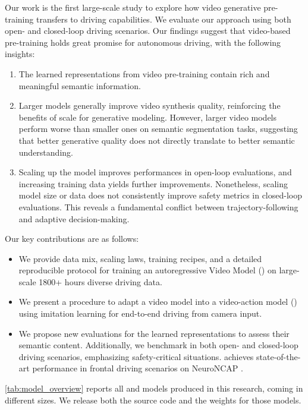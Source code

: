 Our work is the first large-scale study to explore how video generative pre-training transfers to driving capabilities. We evaluate our approach using both open- and closed-loop driving scenarios. Our findings suggest that video-based pre-training holds great promise for autonomous driving, with the following insights:
\begin{enumerate}
    \item The learned representations from video pre-training contain rich and meaningful semantic information.
    \item Larger models generally improve video synthesis quality, reinforcing the benefits of scale for generative modeling. However, larger video models perform worse than smaller ones on semantic segmentation tasks, suggesting that better generative quality does not directly translate to better semantic understanding.
    \item Scaling up the model improves performances in open-loop evaluations, and increasing training data yields further improvements. Nonetheless, scaling model size or data does not consistently improve safety metrics in closed-loop evaluations. This reveals a fundamental conflict between trajectory-following and adaptive decision-making.
\end{enumerate}

Our key contributions are as follows:
\begin{itemize}
    \item We provide data mix, scaling laws, training recipes, and a detailed reproducible protocol for training an autoregressive Video Model (\vm{}) on large-scale 1800+ hours diverse driving data.
    \item We present a procedure to adapt a video model into a video-action model (\vam{}) using imitation learning for end-to-end driving from camera input.
    \item We propose new evaluations for the learned \vm{} representations to assess their semantic content. Additionally, we benchmark \vam{} in both open- and closed-loop driving scenarios, emphasizing safety-critical situations. \vam{} achieves state-of-the-art performance in frontal driving scenarios on NeuroNCAP \citep{ljungbergh2024neuroncap}.
\end{itemize}

\autoref{tab:model_overview} reports all \vm{} and \vam{} models produced in this research, coming in different sizes. We release both the source code and the weights for those models.

